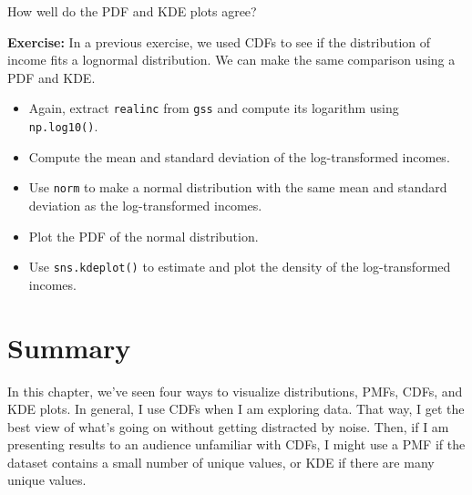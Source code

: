 How well do the PDF and KDE plots agree?

\textbf{Exercise:} In a previous exercise, we used CDFs to see if the
distribution of income fits a lognormal distribution. We can make the
same comparison using a PDF and KDE.

\begin{itemize}
\item
  Again, extract \passthrough{\lstinline!realinc!} from
  \passthrough{\lstinline!gss!} and compute its logarithm using
  \passthrough{\lstinline!np.log10()!}.
\item
  Compute the mean and standard deviation of the log-transformed
  incomes.
\item
  Use \passthrough{\lstinline!norm!} to make a normal distribution with
  the same mean and standard deviation as the log-transformed incomes.
\item
  Plot the PDF of the normal distribution.
\item
  Use \passthrough{\lstinline!sns.kdeplot()!} to estimate and plot the
  density of the log-transformed incomes.
\end{itemize}

\hypertarget{summary}{%
\section{Summary}\label{summary}}

In this chapter, we've seen four ways to visualize distributions, PMFs,
CDFs, and KDE plots. In general, I use CDFs when I am exploring data.
That way, I get the best view of what's going on without getting
distracted by noise. Then, if I am presenting results to an audience
unfamiliar with CDFs, I might use a PMF if the dataset contains a small
number of unique values, or KDE if there are many unique values.

